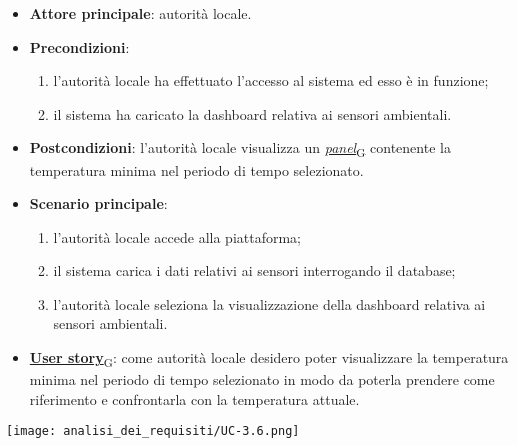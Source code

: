 \begin{itemize}
	\item \textbf{Attore principale}: autorità locale.
	\item \textbf{Precondizioni}:
	      \begin{enumerate}
		      \item l'autorità locale ha effettuato l'accesso al sistema ed esso è in funzione;
		      \item il sistema ha caricato la dashboard relativa ai sensori ambientali.
	      \end{enumerate}
	\item \textbf{Postcondizioni}: l'autorità locale visualizza un \href{https://7last.github.io/docs/rtb/documentazione-interna/glossario\#panel}{\textit{panel}\textsubscript{G}} contenente la temperatura minima nel periodo di tempo selezionato.
	\item \textbf{Scenario principale}:
	      \begin{enumerate}
		      \item l'autorità locale accede alla piattaforma;
		      \item il sistema carica i dati relativi ai sensori interrogando il database;
		      \item l'autorità locale seleziona la visualizzazione della dashboard relativa ai sensori ambientali.
	      \end{enumerate}
	\item \href{https://7last.github.io/docs/rtb/documentazione-interna/glossario\#user-story}{\textbf{User story}\textsubscript{G}}:
	      come autorità locale desidero poter visualizzare la temperatura minima nel periodo di tempo selezionato
	      in modo da poterla prendere come riferimento e confrontarla con la temperatura attuale.
\end{itemize}
\begin{center}
	\texttt{[image: analisi\_dei\_requisiti/UC-3.6.png]}
\end{center}


